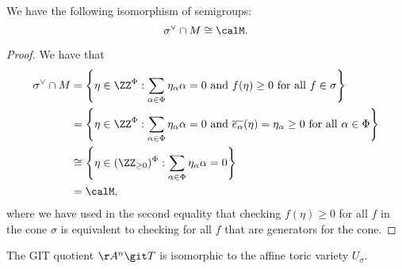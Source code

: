 \begin{proposition}
We have the following isomorphism of semigroups:
$$\sigma^\vee \cap M \cong \calM.$$
\end{proposition}
\begin{proof}
We have that
\begin{align*}
	\sigma^\vee \cap M &= \left\{ \eta \in \ZZ^\Phi : \sum_{\alpha\in\Phi} \eta_\alpha \alpha = 0 \text{ and } f(\eta) \ge 0 \text{ for all } f \in \sigma\right\} \\
	&= \left\{ \eta \in \ZZ^\Phi : \sum_{\alpha\in\Phi} \eta_\alpha \alpha = 0 \text{ and } \overline{e_\alpha}(\eta)=\eta_\alpha \ge 0 \text{ for all } \alpha \in \Phi \right\} \\
	&\cong \left\{\eta \in (\ZZ_{\ge 0})^\Phi : \sum_{\alpha\in\Phi} \eta_\alpha \alpha = 0\right\} \\
	&= \calM,
\end{align*}
where we have used in the second equality that checking $f(\eta) \ge 0$ for all $f$ in the cone $\sigma$ is equivalent to checking for all $f$ that are generators for the cone.
\end{proof}

\begin{corollary}
The GIT quotient $\AA^n \git T$ is isomorphic to the affine toric variety $U_\sigma$.
\end{corollary}

